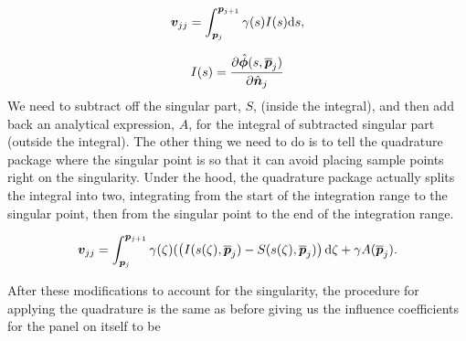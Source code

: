 \begin{equation}
    \bm{v}_{jj} = \int_{\bm{p}_j}^{\bm{p}_{j+1}} \gamma(s) I(s) \mathrm{d} s,
\end{equation}

\where \[I(s)  = \frac{\partial \hat{\bm{\phi}}(s,\overline{\bm{p}}_j)}{\partial \hat{\bm{n}}_j}\]
%
We need to subtract off the singular part, \(S\), (inside the integral), and then add back an analytical expression, \(A\), for the integral of subtracted singular part (outside the integral).
%
The other thing we need to do is to tell the quadrature package where the singular point is so that it can avoid placing sample points right on the singularity.
%
Under the hood, the quadrature package actually splits the integral into two, integrating from the start of the integration range to the singular point, then from the singular point to the end of the integration range.

\begin{equation}
    \bm{v}_{jj} = \int_{\bm{p}_j}^{\bm{p}_{j+1}} \gamma(\zeta)(\left(I(s(\zeta),\overline{\bm{p}}_j) - S(s(\zeta),\overline{\bm{p}}_j) \right)\mathrm{d} \zeta + \gamma A(\overline{\bm{p}}_j).
\end{equation}
%
%


\noindent After these modifications to account for the singularity, the procedure for applying the quadrature is the same as before giving us the influence coefficients for the panel on itself to be

